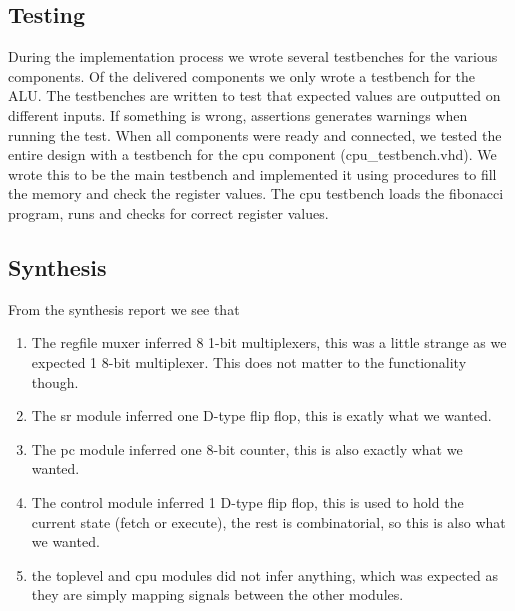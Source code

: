 \documentclass[11pt]{report}
\begin{document}
\begin{comment}
\begin{figure}
\centering
\texttt{[image: state\_diagram.png]} \\
\caption{This figure shows a state-machine with 4 states. However, in reality there 
are only 2 states (fetch and execute), but this figure shows what is going on in some 
better detail. The topmost state is the fetch state, and the three states at the 
bottom is the execute state with different opcodes.}
\end{figure}

\end{comment}

\subsection*{Testing}

During the implementation process we wrote several testbenches
for the various components. Of the delivered components we only wrote a testbench
for the ALU. The testbenches are written to test
that expected values are outputted on different inputs. If something is wrong, 
assertions generates warnings when running the test. 
When all components were ready and connected, we tested the entire 
design with a testbench for the cpu component (cpu\_testbench.vhd).  
We wrote this to be the main testbench and implemented it using procedures 
to fill the memory and check the register values. The cpu testbench loads the 
fibonacci program, runs and checks for correct register values.

\subsection*{Synthesis}

From the synthesis report we see that
\begin{enumerate}
\item The regfile muxer inferred 8 1-bit multiplexers, this was a
  little strange as we expected 1 8-bit multiplexer.  This does not
  matter to the functionality though.
\item The sr module inferred one D-type flip flop, this is exatly what
  we wanted.
\item The pc module inferred one 8-bit counter, this is also exactly
  what we wanted.
\item The control module inferred 1 D-type flip flop, this is used to
  hold the current state (fetch or execute), the rest is
  combinatorial, so this is also what we wanted.
\item the toplevel and cpu modules did not infer anything, which was
  expected as they are simply mapping signals between the other
  modules.
\end{enumerate}
\end{document}
